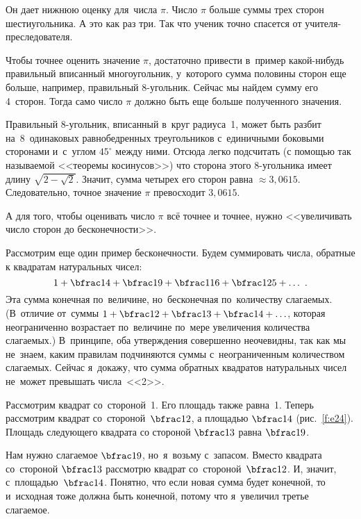 Он дает нижнюю оценку для~числа $\pi$. Число $\pi$ больше суммы трех сторон шестиугольника. А это как раз три. Так что
ученик точно спасется от учителя-преследователя.

Чтобы точнее оценить значение $\pi$, достаточно привести в~пример какой-нибудь правильный вписанный многоугольник,
у~которого сумма половины сторон еще больше, например, правильный 8-угольник. Сейчас мы найдем сумму его
4~сторон. Тогда само число $\pi$ должно быть еще больше полученного значения.

Правильный 8-угольник, вписанный в~круг радиуса~1, может быть разбит на~8~одинаковых равнобедренных
треугольников с~единичными боковыми сторонами и~с~углом $45^{\circ}$ между ними.
Отсюда легко подсчитать (с помощью так называемой <<теоремы косинусов>>)
что сторона этого 8-угольника имеет длину $\sqrt{2-\sqrt2}$.
 Значит, сумма четырех его сторон равна $\approx 3,0615$.
Следовательно, точное значение $\pi$ превосходит $3,0615$.

А для того, чтобы оценивать число $\pi$ всё точнее и точнее, нужно <<увеличивать число сторон до бесконечности>>.

Рассмотрим еще один пример бесконечности. Будем суммировать числа, обратные к квадратам натуральных
чисел:
$$
1 + \bfrac14 + \bfrac19 + \bfrac1{16} +\bfrac1{25} +\ldots~.
$$
Эта сумма конечная по~величине, но~бесконечная по~количеству слагаемых. (В~отличие от~суммы $1 + \bfrac12 +
\bfrac13 + \bfrac14 +\ldots$, которая неограниченно возрастает по~величине по~мере увеличения количества
слагаемых.) В~принципе, оба утверждения совершенно неочевидны, так как мы не~знаем, каким
правилам подчиняются суммы с~неограниченным количеством слагаемых.
 Сейчас я~докажу, что сумма
обратных квадратов натуральных чисел не~может превышать числа~<<2>>.

Рассмотрим квадрат со~стороной~1. Его площадь также равна~1. Теперь рассмотрим квадрат со~стороной~$\bfrac12$,
а площадью $\bfrac14$ (рис.~\ref{f:e24}). Площадь следующего квадрата со стороной $\bfrac13$ равна $\bfrac19$.



Нам нужно слагаемое $\bfrac19$, но~я~возьму с~запасом. Вместо квадрата со~стороной $\bfrac13$ рассмотрю
квадрат со~стороной~$\bfrac12$. И, значит, с~площадью~$\bfrac14$. Понятно, что если новая сумма будет конечной, то
и~исходная тоже должна быть конечной, потому что я~увеличил третье слагаемое.


